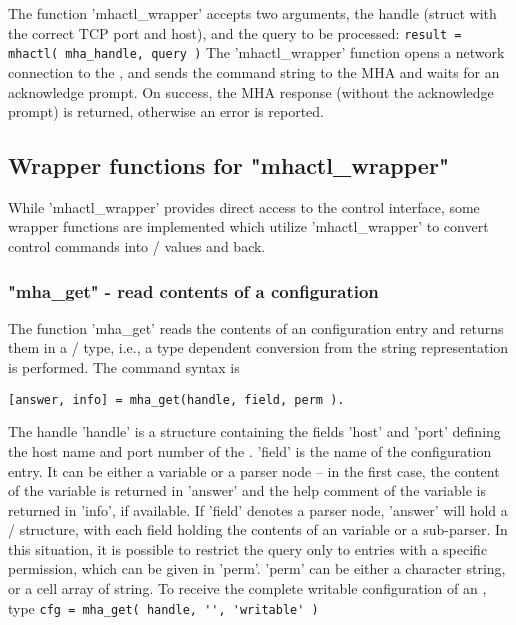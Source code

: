 The function 'mhactl\_wrapper' accepts two arguments, the \mha{} handle 
(struct with the correct TCP port and host), and the \mha{} query to be processed:
\verb!result = mhactl( mha_handle, query )!
%
The 'mhactl\_wrapper' function opens a network connection to the \mhad{},
and sends the command string to the MHA and waits for an acknowledge
prompt.
%
On success, the MHA response (without the acknowledge prompt) is
returned, otherwise an error is reported.

\subsection{Wrapper functions for "mhactl\_wrapper"}
\label{sec:mhactl_wrapper}

While 'mhactl\_wrapper' provides direct access to the \mha{} control interface,
some wrapper functions are implemented which utilize 'mhactl\_wrapper' to
convert \mha{} control commands into \Octave{}/ \Matlab{} values and back.

\subsubsection{"mha\_get" - read contents of a \mha configuration}

The function 'mha\_get' reads the contents of an \mha{} configuration
entry and returns them in a \Octave{}/ \Matlab{} type, i.e., a type dependent
conversion from the \mha{} string representation is performed. The
command syntax is
\begin{verbatim}
[answer, info] = mha_get(handle, field, perm ).
\end{verbatim}
The \mha{} handle 'handle' is a structure containing the fields 'host'
and 'port' defining the host name and port number of the \mhad{}.
%
'field' is the name of the \mha{} configuration entry.
%
It can be either a variable or a parser node -- in the first case, the
content of the variable is returned in 'answer' and the help comment
of the variable is returned in 'info', if available.
%
If 'field' denotes a parser node, 'answer' will hold a \Octave{}/ \Matlab{}
structure, with each field holding the contents of an \mha{} variable or a
sub-parser.
%
In this situation, it is possible to restrict the query only to
entries with a specific permission, which can be given in 'perm'.
%
'perm' can be either a character string, or a cell array of string.
%
To receive the complete writable configuration of an \mhad{}, type
\verb!cfg = mha_get( handle, '', 'writable' )!
%

